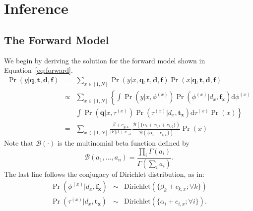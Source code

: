 \section{Inference}\label{s:inference}

\subsection{The Forward Model}\label{ss:forward-model}

We begin by deriving the solution for the forward model shown in
Equation~\eqref{eq:forward}. 
\begin{eqnarray}
  \Pr(y|\mathbf{q}, \mathbf{t}, \mathbf{d}, \mathbf{f}) 
  &=& \sum_{x \in [1, N]} \Pr(y|x, \mathbf{q}, \mathbf{t}, \mathbf{d}, \mathbf{f}) \Pr(x|\mathbf{q}, \mathbf{t}, \mathbf{d}, \mathbf{f}) \nonumber\\
  &\propto& \sum_{x \in [1, N]} \left\{ \int \Pr(y|x, \phi^{(x)}) \Pr(\phi^{(x)}|d_x, \mathbf{f_x}) \mathrm{d}\phi^{(x)} \right. \nonumber\\
  && \left. \int \Pr(\mathbf{q}| x, \tau^{(x)}) \Pr(\tau^{(x)}|d_x, \mathbf{t_x})\mathrm{d}\tau^{(x)} \Pr(x) \right\} \nonumber\\
  &=& \sum_{x \in [1, N]} \frac{\beta + c_{y,x}}{|F|\beta + c_{\cdot,x}} \frac{\mathcal{B}(\{\alpha_i + c_{i,x} + c_{i,q} \})}{\mathcal{B}(\{\alpha_i + c_{i,x} \})} \Pr(x) \label{eq:forward-solution}
\end{eqnarray}
Note that $\mathcal{B}(\cdot)$ is the multinomial beta
function defined by \[\mathcal{B}(a_1, \ldots, a_n) = \frac{\prod_i
\Gamma(a_i)}{\Gamma(\sum_i a_i)}. \]
The last line follows the conjugacy of Dirichlet distribution, as in:
\begin{eqnarray*}
\Pr(\phi^{(x)}|d_x,\mathbf{f_x}) &\sim& \mathrm{Dirichlet}(\{\beta_k + c_{k,x}; \forall k \}) \\
\Pr(\tau^{(x)}|d_x, \mathbf{t_x}) &\sim& \mathrm{Dirichlet}(\{\alpha_i + c_{i,x}; \forall i \}).
\end{eqnarray*}

